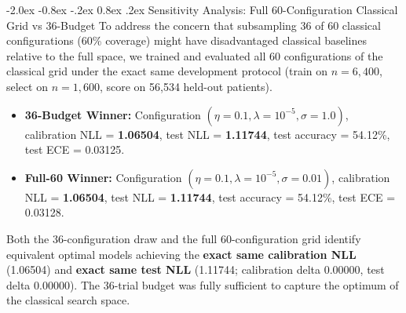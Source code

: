 \documentclass[10pt,a4paper]{article}
\makeatletter
\renewcommand{\subsection}{\@startsection{subsection}{2}{\z@}%
  {-2.0ex \@plus -0.8ex \@minus -.2ex}%
  {0.8ex \@plus.2ex}%
  {\normalfont\large\sffamily\bfseries\color{naturedark}}}
\makeatother
\begin{document}
\subsection{Sensitivity Analysis: Full 60-Configuration Classical Grid vs 36-Budget}
To address the concern that subsampling 36 of 60 classical configurations (60\% coverage) might have disadvantaged classical baselines relative to the full space, we trained and evaluated all 60 configurations of the classical grid under the exact same development protocol (train on $n=6,400$, select on $n=1,600$, score on 56,534 held-out patients).
\begin{itemize}
  \item \textbf{36-Budget Winner:} Configuration $(\eta=0.1, \lambda=10^{-5}, \sigma=1.0)$, calibration NLL = \textbf{1.06504}, test NLL = \textbf{1.11744}, test accuracy = 54.12\%, test ECE = 0.03125.
  \item \textbf{Full-60 Winner:} Configuration $(\eta=0.1, \lambda=10^{-5}, \sigma=0.01)$, calibration NLL = \textbf{1.06504}, test NLL = \textbf{1.11744}, test accuracy = 54.12\%, test ECE = 0.03128.
\end{itemize}
Both the 36-configuration draw and the full 60-configuration grid identify equivalent optimal models achieving the \textbf{exact same calibration NLL} (1.06504) and \textbf{exact same test NLL} (1.11744; calibration delta $0.00000$, test delta $0.00000$). The 36-trial budget was fully sufficient to capture the optimum of the classical search space.
\end{document}
